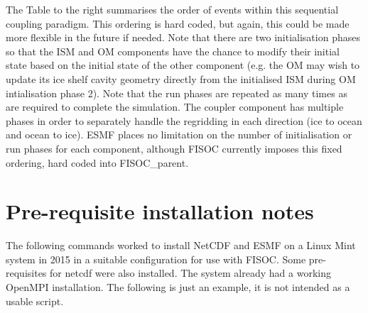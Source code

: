 \documentclass[11pt]{article}
\begin{document}
The Table to the right summarises the order of events within this sequential coupling paradigm.
This ordering is hard coded, but again, this could be made more flexible in the future
if needed.
Note that there are two initialisation phases so that the ISM and OM components have the chance
to modify their initial state based on the initial state of the other component
(e.g. the OM may wish to update its ice shelf cavity geometry directly from the initialised
ISM during OM intialisation phase 2).
Note that the run phases are repeated as many times as are required to complete the simulation.
The coupler component  has multiple phases in order to separately handle
the regridding in each direction (ice to ocean and ocean to ice).
ESMF places no limitation on the number of initialisation or run phases for each component,
although FISOC currently imposes this fixed ordering, hard coded into FISOC\_parent.




\clearpage

\appendix

\section{Pre-requisite installation notes}
\label{app:A}
The following commands worked to install NetCDF and ESMF on a Linux Mint system in 2015 
in a suitable configuration for use with FISOC. 
Some pre-requisites for netcdf were also installed.
The system already had a working OpenMPI installation.
The following is just an example, it is not intended as a usable script. 
\end{document}

